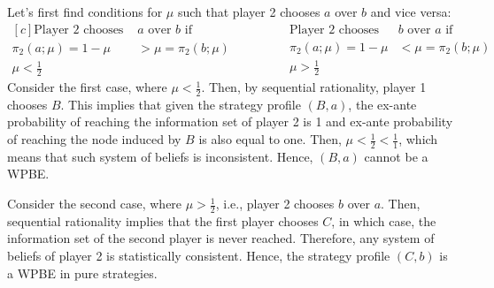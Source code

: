 \documentclass[]{article}
\begin{document}
Let's first find conditions for $\mu$ such that player 2 chooses $a$ over $b$ and vice versa:
\begin{equation*}
	\begin{aligned}[c]
		\text{Player 2 chooses }&a\text{ over $b$ if }\\
		\pi_2(a; \mu) = 1 - \mu& > \mu = \pi_2(b; \mu) \\
		\mu < \frac{1}{2}
	\end{aligned}
	\qquad\qquad\begin{aligned}
		\text{Player 2 chooses }&b\text{ over $a$ if }\\
		\pi_2(a; \mu) = 1 - \mu& < \mu = \pi_2(b; \mu) \\
		\mu > \frac{1}{2}
	\end{aligned}
\end{equation*}
Consider the first case, where $\mu < \frac{1}{2}$. Then, by sequential rationality, player 1 chooses $B$. This implies that given the strategy profile $(B, a)$, the ex-ante probability of reaching the information set of player 2 is 1 and ex-ante probability of reaching the node induced by $B$ is also equal to one. Then, $\mu < \frac{1}{2} < \frac{1}{1}$, which means that such system of beliefs is inconsistent. Hence, $(B, a)$ cannot be a WPBE.

Consider the second case, where $\mu > \frac{1}{2}$, i.e., player 2 chooses $b$ over $a$. Then, sequential rationality implies that the first player chooses $C$, in which case, the information set of the second player is never reached. Therefore, any system of beliefs of player 2 is statistically consistent. Hence, the strategy profile $(C, b)$ is a WPBE in pure strategies.

\end{document}
